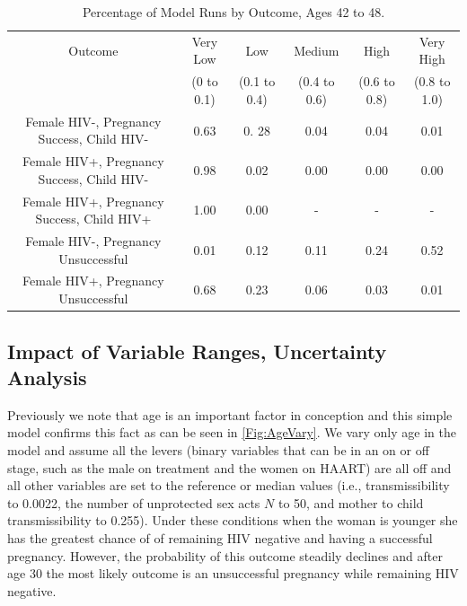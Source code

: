 \documentclass[11pt]{nih_mod}
\begin{document}
\begin{table}[H]
\begin{center}
\begin{tabular}{|c|c|c|c|c|c|}
\hline
Outcome & Very Low& Low & Medium& High& Very High\\
 & (0 to 0.1) & (0.1 to 0.4) & (0.4 to 0.6) & (0.6 to 0.8) & (0.8 to 1.0)\\
\hline
\hline
Female HIV-, Pregnancy Success, Child HIV- & 0.63 & 0. 28 & 0.04 & 0.04 & 0.01\\
Female HIV+, Pregnancy Success, Child HIV- & 0.98 & 0.02 & 0.00 & 0.00 & 0.00\\
Female HIV+, Pregnancy Success, Child HIV+ & 1.00 & 0.00 & - & - &- \\
Female HIV-, Pregnancy Unsuccessful & 0.01 & 0.12 & 0.11 & 0.24 & 0.52 \\
Female HIV+, Pregnancy Unsuccessful & 0.68 & 0.23 & 0.06 & 0.03 & 0.01\\
\hline
\end{tabular}
	\caption{Percentage of Model Runs by Outcome, Ages 42 to 48. \label{tab:outcomefreqs42}}
\end{center}
\end{table}

\subsection{Impact of Variable Ranges, Uncertainty Analysis}
Previously we note that age is an important factor in conception and this simple model confirms this fact as can be seen in \ref{Fig:AgeVary}.  We vary only age in the model and assume all the levers (binary variables that can be in an on or off stage, such as the male on treatment and the women on HAART) are all off and all other variables are set to the reference or median values (i.e., transmissibility to 0.0022, the number of unprotected sex acts $N$ to 50, and mother to child transmissibility to 0.255). Under these conditions when the woman is younger she has the greatest chance of of remaining HIV negative and having a successful pregnancy.  However, the probability of this outcome steadily declines and after age 30 the most likely outcome is an unsuccessful pregnancy while remaining HIV negative.
\end{document}
